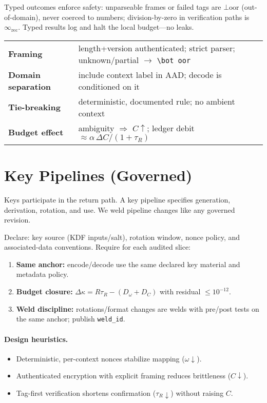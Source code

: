 Typed outcomes enforce safety: unparseable frames or failed tags are \(\bot\!\mathrm{oor}\) (out-of-domain), never coerced to numbers; division-by-zero in verification paths is \(\infty_{\mathrm{rec}}\). Typed results log and halt the local budget—no leaks.
\begin{eqbox}
\small
\begin{tabularx}{\linewidth}{@{}>{\bfseries}l X@{}}
Framing & length+version authenticated; strict parser; unknown/partial $\rightarrow$ \texttt{\textbackslash bot oor} \\
Domain separation & include context label in AAD; decode is conditioned on it \\
Tie-breaking & deterministic, documented rule; no ambient context \\
Budget effect & ambiguity $\Rightarrow$ $C\uparrow$; ledger debit $\approx \alpha\,\Delta C/(1+\tau_R)$ \\
\end{tabularx}
\end{eqbox}
\section{Key Pipelines (Governed)}
\label{sec:crypto-keys}

Keys participate in the return path. A key pipeline specifies generation, derivation, rotation, and use. We weld pipeline changes like any governed revision.

\begin{eqbox}
Declare: key source (KDF inputs/salt), rotation window, nonce policy, and associated-data conventions. Require for each audited slice:
\begin{enumerate}[leftmargin=1.25em]
  \item \textbf{Same anchor:} encode/decode use the same declared key material and metadata policy.
  \item \textbf{Budget closure:} \(\Delta\kappa = R\tau_{R}-(D_{\omega}+D_{C})\) with residual \(\le 10^{-12}\).
  \item \textbf{Weld discipline:} rotations/format changes are welds with pre/post tests on the same anchor; publish \texttt{weld\_id}.
\end{enumerate}
\end{eqbox}

\paragraph{Design heuristics.}
\begin{itemize}[leftmargin=1.25em]
  \item Deterministic, per-context nonces stabilize mapping (\(\omega\downarrow\)).
  \item Authenticated encryption with explicit framing reduces brittleness (\(C\downarrow\)).
  \item Tag-first verification shortens confirmation (\(\tau_{R}\downarrow\)) without raising \(C\).
\end{itemize}

